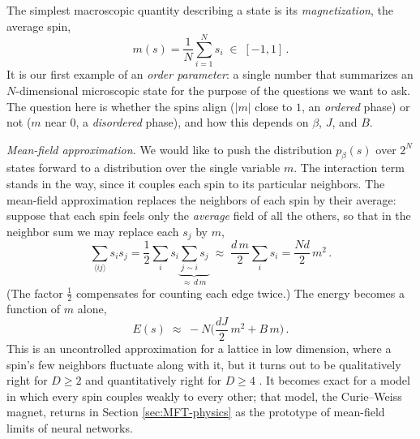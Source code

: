 \documentclass[11pt]{article}
\begin{document}
The simplest macroscopic quantity describing a state is its \emph{magnetization}, the average spin,
%
\begin{equation}
    m(s) = \frac{1}{N}\sum_{i=1}^N s_i \;\in\; [-1,1]\,. \label{magnetization}
\end{equation}
%
It is our first example of an \emph{order parameter}: a single number that summarizes an $N$-dimensional microscopic state for the purpose of the questions we want to ask. The question here is whether the spins align ($|m|$ close to $1$, an \emph{ordered} phase) or not ($m$ near $0$, a \emph{disordered} phase), and how this depends on $\beta$, $J$, and $B$.

\emph{Mean-field approximation.} We would like to push the distribution $p_\beta(s)$ over $2^N$ states forward to a distribution over the single variable $m$. The interaction term stands in the way, since it couples each spin to its particular neighbors. The mean-field approximation replaces the neighbors of each spin by their average: suppose that each spin feels only the \emph{average} field of all the others, so that in the neighbor sum we may replace each $s_j$ by $m$,
%
\begin{equation}
    \sum_{\langle ij\rangle} s_i s_j = \frac{1}{2}\sum_i s_i \underbrace{\sum_{j\sim i} s_j}_{\approx\, d\,m} \;\approx\; \frac{d\,m}{2}\sum_i s_i = \frac{N d}{2}\,m^2\,.
\end{equation}
%
(The factor $\frac{1}{2}$ compensates for counting each edge twice.) The energy becomes a function of $m$ alone,
%
\begin{equation}
    E(s) \;\approx\; -N\Big(\frac{dJ}{2}\,m^2 + B\,m\Big)\,. \label{ising-E-mf}
\end{equation}
%
This is an uncontrolled approximation for a lattice in low dimension, where a spin's few neighbors fluctuate along with it, but it turns out to be qualitatively right for $D\geq 2$ and quantitatively right for $D\geq 4$ \cite[Chapter 1]{TongSFT}. It becomes exact for a model in which every spin couples weakly to every other; that model, the Curie--Weiss magnet, returns in Section \ref{sec:MFT-physics} as the prototype of mean-field limits of neural networks.
\end{document}
